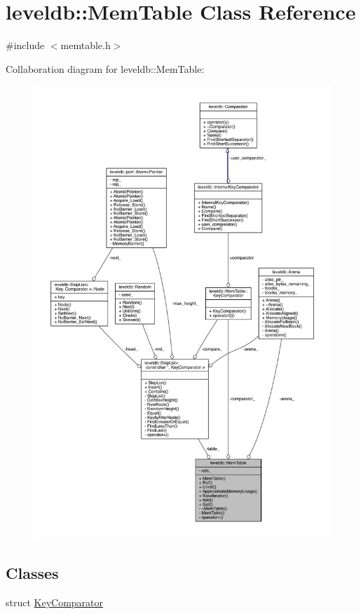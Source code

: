 \hypertarget{classleveldb_1_1_mem_table}{}\section{leveldb\+:\+:Mem\+Table Class Reference}
\label{classleveldb_1_1_mem_table}


{\ttfamily \#include $<$memtable.\+h$>$}



Collaboration diagram for leveldb\+:\+:Mem\+Table\+:\nopagebreak
\begin{figure}[H]
\begin{center}
\leavevmode
\includegraphics[width=350pt]{classleveldb_1_1_mem_table__coll__graph}
\end{center}
\end{figure}
\subsection*{Classes}
\begin{DoxyCompactItemize}
\item 
struct \hyperlink{structleveldb_1_1_mem_table_1_1_key_comparator}{Key\+Comparator}
\end{DoxyCompactItemize}

